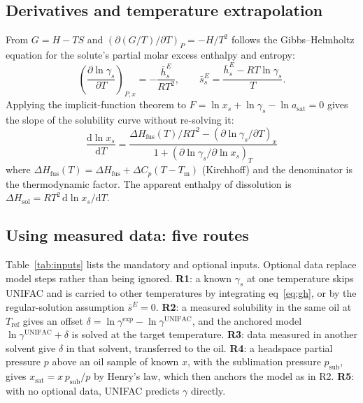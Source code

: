 \documentclass[journal=jceaax,manuscript=article,layout=twocolumn]{achemso}
\begin{document}
\subsection{Derivatives and temperature extrapolation}
From $G=H-TS$ and $(\partial(G/T)/\partial T)_P=-H/T^2$ follows the Gibbs--Helmholtz equation for the solute's partial molar excess enthalpy and entropy:
\begin{equation}
\left(\frac{\partial\ln\gamma_s}{\partial T}\right)_{P,x}=-\frac{\bar h_s^E}{RT^2},\qquad \bar s_s^E=\frac{\bar h_s^E-RT\ln\gamma_s}{T}.
\label{eq:gh}
\end{equation}
Applying the implicit-function theorem to $F=\ln x_s+\ln\gamma_s-\ln a_\mathrm{sat}=0$ gives the slope of the solubility curve without re-solving it:
\begin{equation}
\frac{\mathrm{d}\ln x_s}{\mathrm{d}T}=\frac{\Delta H_\mathrm{fus}(T)/RT^2-(\partial\ln\gamma_s/\partial T)_x}{1+(\partial\ln\gamma_s/\partial\ln x_s)_T}
\label{eq:dlnx}
\end{equation}
where $\Delta H_\mathrm{fus}(T)=\Delta H_\mathrm{fus}+\Delta C_p(T-T_\mathrm{m})$ (Kirchhoff) and the denominator is the thermodynamic factor. The apparent enthalpy of dissolution is $\Delta H_\mathrm{sol}=RT^2\,\mathrm{d}\ln x_s/\mathrm{d}T$.

\subsection{Using measured data: five routes}
Table~\ref{tab:inputs} lists the mandatory and optional inputs. Optional data replace model steps rather than being ignored. \textbf{R1}: a known $\gamma_s$ at one temperature skips UNIFAC and is carried to other temperatures by integrating eq~\ref{eq:gh}, or by the regular-solution assumption $\bar s^E=0$. \textbf{R2}: a measured solubility in the same oil at $T_\mathrm{ref}$ gives an offset $\delta=\ln\gamma^\mathrm{exp}-\ln\gamma^\mathrm{UNIFAC}$, and the anchored model $\ln\gamma^\mathrm{UNIFAC}+\delta$ is solved at the target temperature. \textbf{R3}: data measured in another solvent give $\delta$ in that solvent, transferred to the oil. \textbf{R4}: a headspace partial pressure $p$ above an oil sample of known $x$, with the sublimation pressure $p_\mathrm{sub}$, gives $x_\mathrm{sat}=x\,p_\mathrm{sub}/p$ by Henry's law, which then anchors the model as in R2. \textbf{R5}: with no optional data, UNIFAC predicts $\gamma$ directly.
\end{document}
